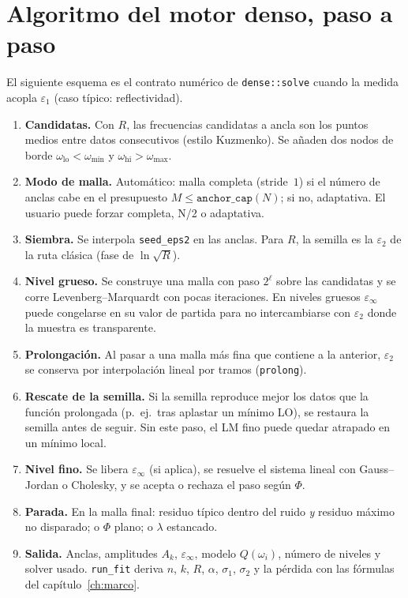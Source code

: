 \section{Algoritmo del motor denso, paso a paso}
\label{sec:dense-algo}

El siguiente esquema es el contrato num\'erico de \texttt{dense::solve} cuando la medida acopla $\varepsilon_1$ (caso t\'ipico: reflectividad).

\begin{enumerate}[leftmargin=*]
\item \textbf{Candidatas.} Con $R$, las frecuencias candidatas a ancla son los puntos medios entre datos consecutivos (estilo Kuzmenko). Se a\~naden dos nodos de borde $\omega_{\mathrm{lo}}<\omega_{\min}$ y $\omega_{\mathrm{hi}}>\omega_{\max}$.
\item \textbf{Modo de malla.} Autom\'atico: malla completa (stride~$1$) si el n\'umero de anclas cabe en el presupuesto $M\le\texttt{anchor\_cap}(N)$; si no, adaptativa. El usuario puede forzar completa, N/2 o adaptativa.
\item \textbf{Siembra.} Se interpola \texttt{seed\_eps2} en las anclas. Para $R$, la semilla es la $\varepsilon_2$ de la ruta cl\'asica (fase de $\ln\sqrt{R}$).
\item \textbf{Nivel grueso.} Se construye una malla con paso $2^{\ell}$ sobre las candidatas y se corre Levenberg--Marquardt con pocas iteraciones. En niveles gruesos $\varepsilon_\infty$ puede congelarse en su valor de partida para no intercambiarse con $\varepsilon_2$ donde la muestra es transparente.
\item \textbf{Prolongaci\'on.} Al pasar a una malla m\'as fina que contiene a la anterior, $\varepsilon_2$ se conserva por interpolaci\'on lineal por tramos (\texttt{prolong}).
\item \textbf{Rescate de la semilla.} Si la semilla reproduce mejor los datos que la funci\'on prolongada (p.\ ej.\ tras aplastar un m\'inimo LO), se restaura la semilla antes de seguir. Sin este paso, el LM fino puede quedar atrapado en un m\'inimo local.
\item \textbf{Nivel fino.} Se libera $\varepsilon_\infty$ (si aplica), se resuelve el sistema lineal con Gauss--Jordan o Cholesky, y se acepta o rechaza el paso seg\'un $\Phi$.
\item \textbf{Parada.} En la malla final: residuo t\'ipico dentro del ruido \emph{y} residuo m\'aximo no disparado; o $\Phi$ plano; o $\lambda$ estancado.
\item \textbf{Salida.} Anclas, amplitudes $A_k$, $\varepsilon_\infty$, modelo $Q(\omega_i)$, n\'umero de niveles y solver usado. \texttt{run\_fit} deriva $n$, $k$, $R$, $\alpha$, $\sigma_1$, $\sigma_2$ y la p\'erdida con las f\'ormulas del cap\'itulo~\ref{ch:marco}.
\end{enumerate}

